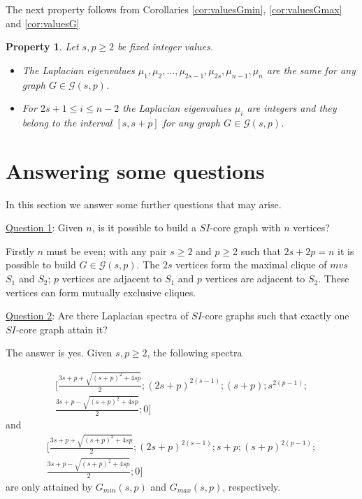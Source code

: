 \documentclass[preprint,12pt]{elsarticle}
\newtheorem{property}[theorem]{Property}
\begin{document}
\bigskip

The next property follows from Corollaries \ref{cor:valuesGmin},  \ref{cor:valuesGmax} and \ref{cor:valuesG}

\begin{property}\label{prop:sameeigen}
Let $s,p \geq 2$ be fixed integer values.
\begin{itemize}
\item The Laplacian eigenvalues $\mu_1, \mu_2,\dots, \mu_{2s-1}, \mu_{2s},  \mu_{n-1},\mu_n$
are the same for any graph $G\in \mathcal{G}(s,p)$.
\item For $2s+1 \leq i \leq n-2$ the Laplacian eigenvalues $\mu_i$ are integers and they 
belong to the interval $[s,s+p]$ for any graph $G\in \mathcal{G}(s,p)$.
\end{itemize}
\end{property}



\section{Answering some questions}

In this section we answer some further questions that may arise.
\bigskip

\noindent \underline{Question 1}: Given $n$, is it possible to build a $SI$-core graph with $n$ vertices?

Firstly $n$ must be even;
with any pair $s \geq 2$ and $p \geq 2$ such that $2s+2p=n$
it is possible to build $G \in {\mathcal G}(s,p)$. 
The $2s$ vertices form the maximal clique of $mvs$ $S_1$ and $S_2$;
$p$ vertices are adjacent to $S_1$ and $p$ vertices are adjacent to $S_2$.
These vertices can form mutually exclusive cliques. 

\bigskip

\noindent\underline{Question 2}: Are there Laplacian spectra of $SI$-core graphs such that exactly one $SI$-core graph attain
it?

The answer is yes. Given $s, p \geq 2$, the following spectra  

\[
\begin{aligned}
\bigg[  \frac{3s+p  +\sqrt{(s+p)^2 + 4sp}}{2};( 2s+p)^{2(s-1)};(s+p); s^{2(p-1)};\\
\frac{3s+p - \sqrt{(s+p)^2 + 4sp}}{2};0\bigg]
\end{aligned}
\]
and 
\[
\begin{aligned}
\bigg[ \frac{3s+p  +\sqrt{(s+p)^2 + 4sp}}{2}; ( 2s+p)^{2(s-1)}; s+p; (s+p)^{2(p-1)}; \\
\frac{3s+p - \sqrt{(s+p)^2 + 4sp}}{2}; 0 \bigg]
\end{aligned}
\]
are only attained by $G_{min}(s,p)$ and $G_{max}(s,p)$, respectively.
\end{document}
